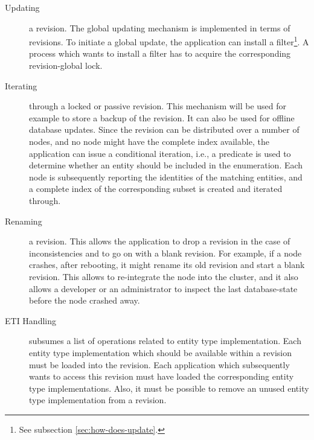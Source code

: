 \documentclass[a4paper, 10pt]{book}
\begin{document}
\begin{description}
                                    \item[Updating] a revision. The global updating mechanism is
                                        implemented in terms of revisions. To initiate a global update, the
                                        application can install a filter\footnote{See subsection
                                        \vref{sec:how-does-update}.}.  A process which wants to install a
                                        filter has to acquire the corresponding revision-global lock.  
                                    \item[Iterating] through a locked or passive revision. This mechanism
                                        will be used for example to store a backup of the revision. It can
                                        also be used for offline database updates.  Since the revision can
                                        be distributed over a number of nodes, and no node might have the
                                        complete index available, the application can issue a conditional
                                        iteration, i.e., a predicate is used to determine whether an entity
                                        should be included in the enumeration.  Each node is subsequently
                                        reporting the identities of the matching entities, and a complete
                                        index of the corresponding subset is created and iterated through.
                                    \item[Renaming ] a revision. This allows the application to drop a
                                        revision in the case of inconsistencies and to go on with a blank
                                        revision. For example, if a node crashes, after rebooting, it might
                                        rename its old revision and start a blank revision. This allows to
                                        re-integrate the node into the cluster, and it also allows a
                                        developer or an administrator to inspect the last database-state
                                        before the node crashed away. 
                                    \item[ETI Handling] subsumes a list of operations related to entity
                                        type implementation. Each entity type implementation which should be
                                        available within a revision must be loaded into the revision. Each
                                        application which subsequently wants to access this revision must
                                        have loaded the corresponding entity type implementations. Also, it
                                        must be possible to remove an unused entity type implementation from
                                        a revision.
                                \end{description}
\end{document}
